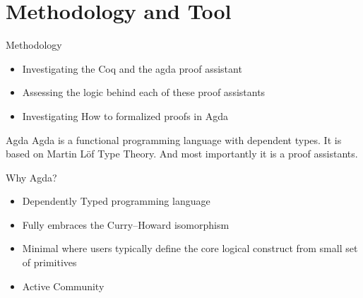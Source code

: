 \documentclass{beamer}
\begin{document}
\section{Methodology and Tool}
\begin{frame}{Methodology}
    \begin{itemize}
      \item Investigating the Coq and the agda proof assistant
      \item Assessing the logic behind each of these proof assistants
      \item Investigating How to formalized proofs in Agda
    \end{itemize}
\end{frame}
\begin{frame}{Agda}
Agda is a functional programming language with dependent types. It is based on Martin Löf Type Theory. And most importantly it is a proof assistants.
\cite{inproceedings}
\end{frame}
\begin{frame}{Why Agda?}
  \begin{itemize}
    \item Dependently Typed programming language
    \item Fully embraces the Curry–Howard isomorphism
    \item Minimal where users typically define the core logical construct from small set of primitives
    \item Active Community
  \end{itemize}
\end{frame}
\end{document}

